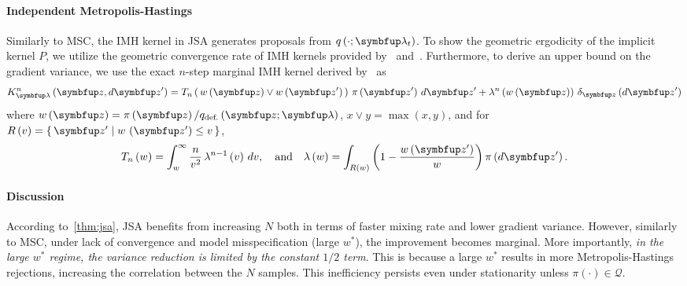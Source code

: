 \paragraph{Independent Metropolis-Hastings}
Similarly to MSC, the IMH kernel in JSA generates proposals from \(q\left(\cdot; \vlambda_t\right)\).
To show the geometric ergodicity of the implicit kernel \(P\), we utilize the geometric convergence rate of IMH kernels provided by~\citet[Theorem 2.1]{10.2307/2242610} and~\citet{wang_exact_2020}.
Furthermore, to derive an upper bound on the gradient variance, we use the exact \(n\)-step marginal IMH kernel derived by~\citet{Smith96exacttransition} as
{%
  \begin{align}
  K^n_{\vlambda}\left(\vz, d\vz^{\prime}\right) 
  = T_n\left(\, w\left(\vz\right) \vee w\left(\vz^{\prime}\right)\,\right) \, \pi\left(\vz^{\prime}\right) \, d\vz^{\prime}
  + \lambda^n\left(w\left(\vz\right)\right) \, \delta_{\vz}\left(d\vz^{\prime}\right)
  \label{eq:imh_exact_kernel}
  \end{align}
}%
where {\(w\left(\vz\right) = \pi\left(\vz\right)/q_{\text{def.}}\left(\vz; \vlambda\right)\), \(x \vee y = \max\left(x, y\right)\)}, and for {\(R\left(v\right) = \{\, \vz^{\prime} \mid w\,\left(\vz^{\prime}\right) \leq v \,\}\)}, 
{%
  \begin{align}
    T_n\left(w\right)      = \int_w^{\infty}
    \frac{n}{v^2}
    \, \lambda^{n-1}\left(v\right)\,dv,
    \quad\text{and}\quad
    \lambda\left(w\right) =
    \int_{R\left(w\right)}
    \left( 1 - \frac{w\left(\vz^{\prime}\right)}{w}  \right)
    \pi\left(d\vz^{\prime}\right).\label{eq:T_lambda}
  \end{align}
}%


%
\vspace{-1ex}
\paragraph{Discussion}
According to~\cref{thm:jsa}, JSA benefits from increasing \(N\) both in terms of faster mixing rate and lower gradient variance.
However, similarly to MSC, under lack of convergence and model misspecification (large \(w^*\)), the improvement becomes marginal.
More importantly, \textit{in the large \(w^*\) regime, the variance reduction is limited by the constant \(1/2\) term}.
This is because a large \(w^*\) results in more Metropolis-Hastings rejections, increasing the correlation between the \(N\) samples.
This inefficiency persists even under stationarity unless \(\pi\left(\cdot\right) \in \mathcal{Q}\).

